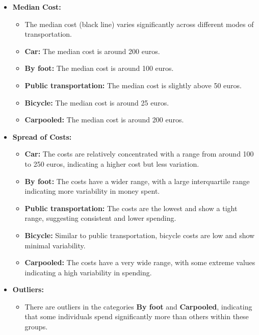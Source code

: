 \begin{itemize}
    \item \textbf{Median Cost:}
    \begin{itemize}
        \item The median cost (black line) varies significantly across different modes of transportation.
        \item \textbf{Car:} The median cost is around 200 euros.
        \item \textbf{By foot:} The median cost is around 100 euros.
        \item \textbf{Public transportation:} The median cost is slightly above 50 euros.
        \item \textbf{Bicycle:} The median cost is around 25 euros.
        \item \textbf{Carpooled:} The median cost is around 200 euros.
    \end{itemize}

    \item \textbf{Spread of Costs:}
    \begin{itemize}
        \item \textbf{Car:} The costs are relatively concentrated with a range from around 100 to 250 euros, indicating a higher cost but less variation.
        \item \textbf{By foot:} The costs have a wider range, with a large interquartile range indicating more variability in money spent.
        \item \textbf{Public transportation:} The costs are the lowest and show a tight range, suggesting consistent and lower spending.
        \item \textbf{Bicycle:} Similar to public transportation, bicycle costs are low and show minimal variability.
        \item \textbf{Carpooled:} The costs have a very wide range, with some extreme values indicating a high variability in spending.
    \end{itemize}

    \item \textbf{Outliers:}
    \begin{itemize}
        \item There are outliers in the categories \textbf{By foot} and \textbf{Carpooled}, indicating that some individuals spend significantly more than others within these groups.
    \end{itemize}


\end{itemize}
